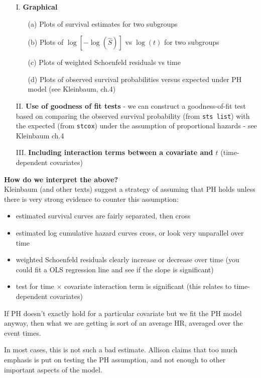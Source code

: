 \documentclass[11pt,psfig]{book}
\begin{document}
\begin{itemize}
\item[I.] {\bf Graphical}
\begin{itemize}
\item[(a)] Plots of survival estimates for two subgroups
\item[(b)] Plots of $\log[-\log(\hat{S})]$ vs $\log(t)$ for two subgroups
\item[(c)] Plots of weighted Schoenfeld residuals vs time
\item[(d)] Plots of observed survival probabilities versus expected under
PH model (see Kleinbaum, ch.4)
\end{itemize}

\item[II.] {\bf Use of goodness of fit tests} - we can construct a
goodness-of-fit test based on comparing the observed survival
probability (from {\tt sts list}) with the expected (from {\tt stcox})
under the assumption of proportional hazards - see Kleinbaum ch.4

\item[III.] {\bf Including interaction terms between a covariate and $t$}
(time-dependent covariates)
\end{itemize}
{\bf How do we interpret the above?}
\\[2ex]
Kleinbaum (and other texts) suggest a strategy of assuming that PH
holds unless there is very strong evidence to counter this assumption:
\begin{itemize}
\item estimated survival curves are fairly separated, then cross
\item estimated log cumulative hazard curves cross, or look very
unparallel over time
\item weighted Schoenfeld residuals clearly increase or decrease over
time (you could fit a OLS regression line and see if the slope is
significant)
\item test for time $\times$ covariate interaction term is significant
(this relates to time-dependent covariates)
\end{itemize}

If PH doesn't exactly hold for a particular covariate but we fit the
PH model anyway, then what we are getting is sort of an average HR,
averaged over the event times.

In most cases, this is not such a bad estimate.  Allison claims that
too much emphasis is put on testing the PH assumption, and not enough
to other important aspects of the model.
\end{document}
